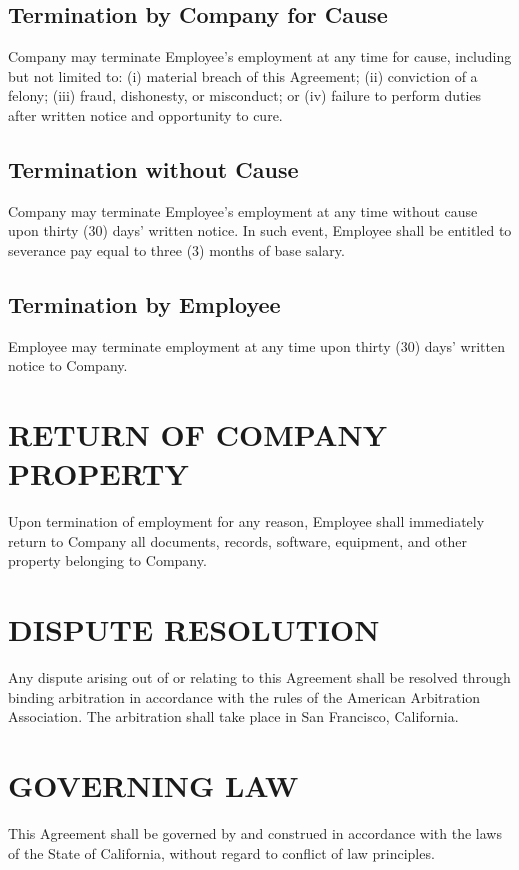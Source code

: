 \documentclass[12pt,letterpaper]{article}
\begin{document}
\subsection{Termination by Company for Cause}
Company may terminate Employee's employment at any time for cause, including but not limited to: (i) material breach of this Agreement; (ii) conviction of a felony; (iii) fraud, dishonesty, or misconduct; or (iv) failure to perform duties after written notice and opportunity to cure.

\subsection{Termination without Cause}
Company may terminate Employee's employment at any time without cause upon thirty (30) days' written notice. In such event, Employee shall be entitled to severance pay equal to three (3) months of base salary.

\subsection{Termination by Employee}
Employee may terminate employment at any time upon thirty (30) days' written notice to Company.

\section{RETURN OF COMPANY PROPERTY}

Upon termination of employment for any reason, Employee shall immediately return to Company all documents, records, software, equipment, and other property belonging to Company.

\section{DISPUTE RESOLUTION}

Any dispute arising out of or relating to this Agreement shall be resolved through binding arbitration in accordance with the rules of the American Arbitration Association. The arbitration shall take place in San Francisco, California.

\section{GOVERNING LAW}

This Agreement shall be governed by and construed in accordance with the laws of the State of California, without regard to conflict of law principles.
\end{document}
